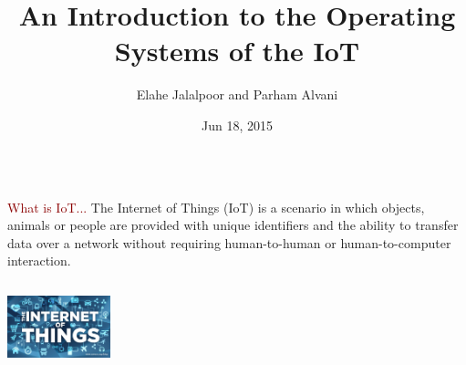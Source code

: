 \documentclass{beamer}
\title[Operating Systems of the IoT]{An Introduction to the Operating Systems of the IoT}
\author{Elahe Jalalpoor and Parham Alvani}
\institute[AUT] {
  Amirkabir University of Technology \\
  \medskip
  {\small\tt elahejalalpoor@gmail.com}\\
  {\small\tt parham.alvani@gmail.com}
  \medskip
}
\date{Jun 18, 2015}
\begin{document}
\begin{frame}
\titlepage
\end{frame}


\begin{frame}
	\begin{columns}
		\begin{column}{10cm}
			\vspace{2cm}
			\begin{block}{
				\centering\textcolor{darkred}{What is IoT...}}
				\justifying
				The Internet of Things (IoT) is a scenario in which objects, animals or people are provided with unique identifiers and the ability to transfer data over a network without requiring human-to-human or human-to-computer interaction.\\
			\end{block}
		\end{column}
	\end{columns}
	\vspace{.75cm}
	\hspace*{8.5cm}\includegraphics[width=3cm]{figs/Internet-of-Things-1.jpg}
\end{frame}
\end{document}
